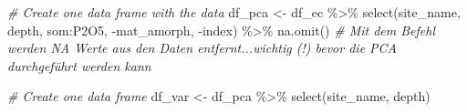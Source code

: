 \documentclass[
]{article}
\newenvironment{Shaded}{\begin{snugshade}}{\end{snugshade}}
\newcommand{\CommentTok}[1]{\textcolor[rgb]{0.56,0.35,0.01}{\textit{#1}}}
\newcommand{\FunctionTok}[1]{\textcolor[rgb]{0.00,0.00,0.00}{#1}}
\newcommand{\NormalTok}[1]{#1}
\newcommand{\OtherTok}[1]{\textcolor[rgb]{0.56,0.35,0.01}{#1}}
\newcommand{\SpecialCharTok}[1]{\textcolor[rgb]{0.00,0.00,0.00}{#1}}
\begin{document}
\begin{Shaded}
\begin{Highlighting}[]
\CommentTok{\# Create one data frame with the data}
\NormalTok{df\_pca }\OtherTok{\textless{}{-}}\NormalTok{ df\_ec }\SpecialCharTok{\%\textgreater{}\%}
  \FunctionTok{select}\NormalTok{(site\_name, depth, som}\SpecialCharTok{:}\NormalTok{P2O5, }\SpecialCharTok{{-}}\NormalTok{mat\_amorph, }\SpecialCharTok{{-}}\NormalTok{index) }\SpecialCharTok{\%\textgreater{}\%}
  \FunctionTok{na.omit}\NormalTok{() }\CommentTok{\# Mit dem Befehl werden NA Werte aus den Daten entfernt...wichtig (!) bevor die PCA durchgeführt werden kann}

\CommentTok{\# Create one data frame }
\NormalTok{df\_var }\OtherTok{\textless{}{-}}\NormalTok{ df\_pca }\SpecialCharTok{\%\textgreater{}\%}
  \FunctionTok{select}\NormalTok{(site\_name, depth)}


\end{Highlighting}
\end{Shaded}
\end{document}

